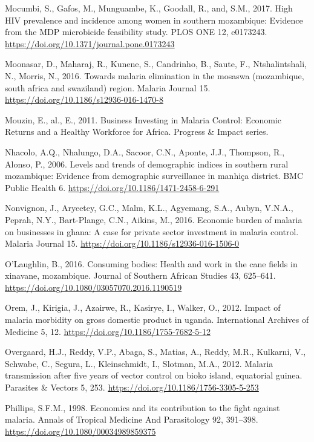 \documentclass[]{article}
\begin{document}
\hypertarget{ref-Mocumbi2017}{}
Mocumbi, S., Gafos, M., Munguambe, K., Goodall, R., and, S.M., 2017.
High HIV prevalence and incidence among women in southern mozambique:
Evidence from the MDP microbicide feasibility study. PLOS ONE 12,
e0173243. \url{https://doi.org/10.1371/journal.pone.0173243}

\hypertarget{ref-Moonasar_2016}{}
Moonasar, D., Maharaj, R., Kunene, S., Candrinho, B., Saute, F.,
Ntshalintshali, N., Morris, N., 2016. Towards malaria elimination in the
mosaswa (mozambique, south africa and swaziland) region. Malaria Journal
15. \url{https://doi.org/10.1186/s12936-016-1470-8}

\hypertarget{ref-Mouzin2011}{}
Mouzin, E., al., E., 2011. Business Investing in Malaria Control:
Economic Returns and a Healthy Workforce for Africa. Progress \& Impact
series.

\hypertarget{ref-Nhacolo_2006}{}
Nhacolo, A.Q., Nhalungo, D.A., Sacoor, C.N., Aponte, J.J., Thompson, R.,
Alonso, P., 2006. Levels and trends of demographic indices in southern
rural mozambique: Evidence from demographic surveillance in manhiça
district. BMC Public Health 6.
\url{https://doi.org/10.1186/1471-2458-6-291}

\hypertarget{ref-Nonvignon_2016}{}
Nonvignon, J., Aryeetey, G.C., Malm, K.L., Agyemang, S.A., Aubyn,
V.N.A., Peprah, N.Y., Bart-Plange, C.N., Aikins, M., 2016. Economic
burden of malaria on businesses in ghana: A case for private sector
investment in malaria control. Malaria Journal 15.
\url{https://doi.org/10.1186/s12936-016-1506-0}

\hypertarget{ref-OLaughlin2016}{}
O'Laughlin, B., 2016. Consuming bodies: Health and work in the cane
fields in xinavane, mozambique. Journal of Southern African Studies 43,
625--641. \url{https://doi.org/10.1080/03057070.2016.1190519}

\hypertarget{ref-Orem_2012}{}
Orem, J., Kirigia, J., Azairwe, R., Kasirye, I., Walker, O., 2012.
Impact of malaria morbidity on gross domestic product in uganda.
International Archives of Medicine 5, 12.
\url{https://doi.org/10.1186/1755-7682-5-12}

\hypertarget{ref-Overgaard2012}{}
Overgaard, H.J., Reddy, V.P., Abaga, S., Matias, A., Reddy, M.R.,
Kulkarni, V., Schwabe, C., Segura, L., Kleinschmidt, I., Slotman, M.A.,
2012. Malaria transmission after five years of vector control on bioko
island, equatorial guinea. Parasites \& Vectors 5, 253.
\url{https://doi.org/10.1186/1756-3305-5-253}

\hypertarget{ref-Phillips98}{}
Phillips, S.F.M., 1998. Economics and its contribution to the fight
against malaria. Annals of Tropical Medicine And Parasitology 92,
391--398. \url{https://doi.org/10.1080/00034989859375}
\end{document}
